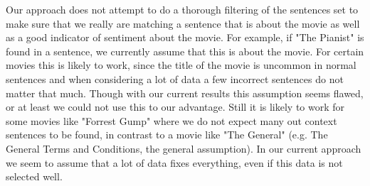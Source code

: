 \documentclass{acm_proc_article-sp}
\begin{document}
Our approach does not attempt to do a thorough filtering of the sentences set to make sure that we really are matching a sentence that is about the movie as well as a good indicator of sentiment about the movie. For example, if "The Pianist" is found in a sentence, we currently assume that this is about the movie. For certain movies this is likely to work, since the title of the movie is uncommon in normal sentences and when considering a lot of data a few incorrect sentences do not matter that much. Though with our current results this assumption seems flawed, or at least we could not use this to our advantage. Still it is likely to work for some movies like "Forrest Gump" where we do not expect many out context sentences to be found, in contrast to a movie like "The General" (e.g. The General Terms and Conditions, the general assumption). In our current approach we seem to assume that a lot of data fixes everything, even if this data is not selected well.




%

%
%

\balancecolumns
\end{document}
